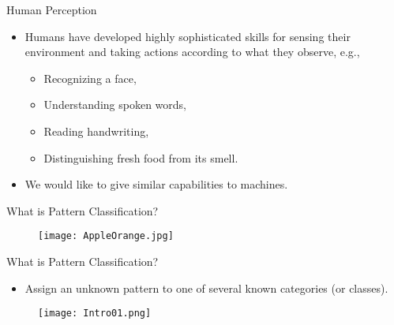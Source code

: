 \begin{frame}{Human Perception}
\begin{itemize}
\setlength{\itemsep}{20pt}
\item Humans have developed highly sophisticated skills for
sensing their environment and taking actions according to
what they observe, e.g.,
\begin{itemize}
\setlength{\itemsep}{5pt}
\item Recognizing a face,
\vspace{1.5cm}
\item Understanding spoken words,
\item Reading handwriting,
\vspace{1cm}
\item Distinguishing fresh food from its smell.
\end{itemize}
\item We would like to give similar capabilities to machines.
\end{itemize}

\end{frame}

\begin{frame}{What is Pattern Classification?}
\begin{figure}
\centering
\texttt{[image: AppleOrange.jpg]}
\end{figure}
\end{frame}

\begin{frame}{What is Pattern Classification?}
\begin{itemize}
\item Assign an unknown pattern to one of several known categories (or classes).
\end{itemize}
\begin{figure}
\centering
\texttt{[image: Intro01.png]}
\end{figure}
\end{frame}


